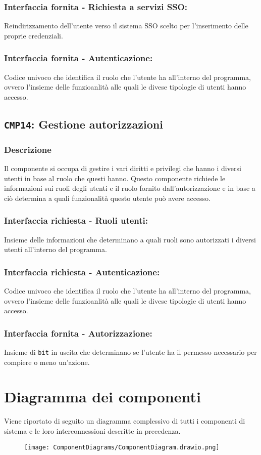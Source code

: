         \subsubsection{Interfaccia fornita - Richiesta a servizi SSO:}
            Reindirizzamento dell'utente verso il sistema SSO scelto per l'inserimento delle proprie credenziali.
        \subsubsection{Interfaccia fornita - Autenticazione:}
            Codice univoco che identifica il ruolo che l'utente ha all'interno del programma, ovvero l'insieme delle funzioanlità alle quali le divese tipologie di utenti hanno accesso.
    
    \subsection{\texttt{CMP14}: Gestione autorizzazioni}
        \subsubsection{Descrizione}
            Il componente si occupa di gestire i vari diritti e privilegi che hanno i diversi utenti in base al ruolo che questi hanno. Questo componente richiede le informazioni sui ruoli degli utenti e il ruolo fornito dall'autorizzazione e in base a ciò determina a quali funzionalità questo utente può avere accesso. 
        \subsubsection{Interfaccia richiesta - Ruoli utenti:}
            Insieme delle informazioni che determinano a quali ruoli sono autorizzati i diversi utenti all'interno del programma.
        \subsubsection{Interfaccia richiesta - Autenticazione:}
            Codice univoco che identifica il ruolo che l'utente ha all'interno del programma, ovvero l'insieme delle funzioanlità alle quali le divese tipologie di utenti hanno accesso.
        \subsubsection{Interfaccia fornita - Autorizzazione:}
            Insieme di \texttt{bit} in uscita che determinano se l'utente ha il permesso necessario per compiere o meno un'azione.
            \newpage

\section{Diagramma dei componenti}
    Viene riportato di seguito un diagramma complessivo di tutti i componenti di sistema e le loro interconnessioni descritte in precedenza.
    \begin{figure}[H]
        \centering
        \texttt{[image: ComponentDiagrams/ComponentDiagram.drawio.png]}
    \end{figure}